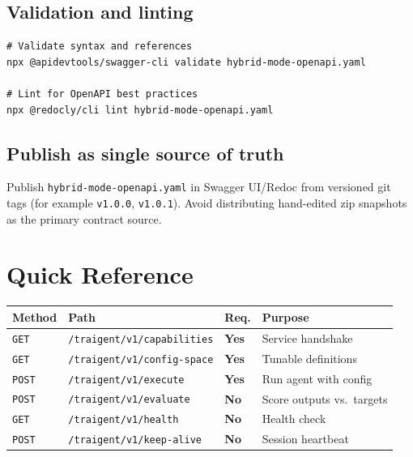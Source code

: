 \documentclass[11pt,a4paper]{article}
\newcommand{\required}{\textbf{Yes}}
\newcommand{\optional}{\textbf{No}}
\begin{document}
\subsection{Validation and linting}

\begin{lstlisting}[basicstyle=\ttfamily\footnotesize]
# Validate syntax and references
npx @apidevtools/swagger-cli validate hybrid-mode-openapi.yaml

# Lint for OpenAPI best practices
npx @redocly/cli lint hybrid-mode-openapi.yaml
\end{lstlisting}

\subsection{Publish as single source of truth}

Publish \texttt{hybrid-mode-openapi.yaml} in Swagger UI/Redoc from versioned git
tags (for example \texttt{v1.0.0}, \texttt{v1.0.1}). Avoid distributing
hand-edited zip snapshots as the primary contract source.

\section{Quick Reference}

\begin{center}\small
\begin{tabularx}{\textwidth}{@{}lllX@{}}
\toprule
\textbf{Method} & \textbf{Path} & \textbf{Req.} & \textbf{Purpose} \\
\midrule
\texttt{GET}  & \texttt{/traigent/v1/capabilities} & \required & Service handshake \\
\texttt{GET}  & \texttt{/traigent/v1/config-space}  & \required & Tunable definitions \\
\texttt{POST} & \texttt{/traigent/v1/execute}       & \required & Run agent with config \\
\texttt{POST} & \texttt{/traigent/v1/evaluate}      & \optional & Score outputs vs.\ targets \\
\texttt{GET}  & \texttt{/traigent/v1/health}        & \optional & Health check \\
\texttt{POST} & \texttt{/traigent/v1/keep-alive}    & \optional & Session heartbeat \\
\bottomrule
\end{tabularx}
\end{center}
\end{document}
